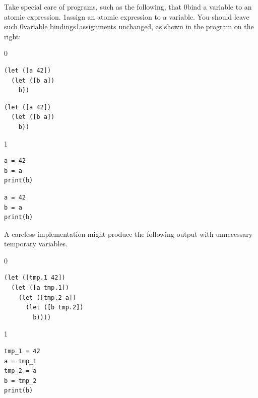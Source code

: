 \documentclass[7x10]{TimesAPriori_MIT}%
\def\racketEd{0}
\def\pythonEd{1}
\def\edition{1}
\newcommand{\racket}[1]{{\if\edition\racketEd{#1}\fi}}
\newcommand{\pythonColor}[0]{}
\newcommand{\python}[1]{{\if\edition\pythonEd\pythonColor #1\fi}}
\numberwithin{theorem}{chapter}
\numberwithin{definition}{chapter}
\numberwithin{equation}{chapter}
\begin{document}
Take special care of programs, such as the following, that
%
\racket{bind a variable to an atomic expression.}
%
\python{assign an atomic expression to a variable.}
%
You should leave such \racket{variable bindings}\python{assignments}
unchanged, as shown in the program on the right:\\
%
{\if\edition\racketEd
\begin{transformation}
\begin{lstlisting}
(let ([a 42])
  (let ([b a])
    b))
\end{lstlisting}
\compilesto
\begin{lstlisting}
(let ([a 42])
  (let ([b a])
    b))
\end{lstlisting}
\end{transformation}
\fi}
{\if\edition\pythonEd\pythonColor
\begin{transformation}
\begin{lstlisting}
a = 42
b = a
print(b)
\end{lstlisting}
\compilesto
\begin{lstlisting}
a = 42
b = a
print(b)
\end{lstlisting}
\end{transformation}
\fi}
%
\noindent A careless implementation might produce the following output with
unnecessary temporary variables.
\begin{center}
\begin{minipage}{0.4\textwidth}
{\if\edition\racketEd
\begin{lstlisting}
(let ([tmp.1 42])
  (let ([a tmp.1])
    (let ([tmp.2 a])
      (let ([b tmp.2])
        b))))
\end{lstlisting}
\fi}
{\if\edition\pythonEd\pythonColor
\begin{lstlisting}
tmp_1 = 42
a = tmp_1
tmp_2 = a
b = tmp_2
print(b)
\end{lstlisting}
\fi}
\end{minipage}
\end{center}
\end{document}

